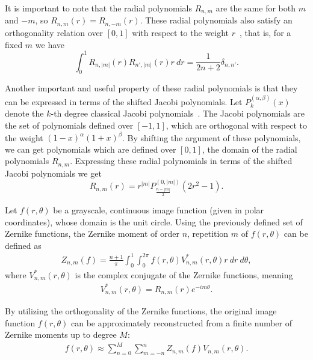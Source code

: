 It is important to note that the radial polynomials $R_{n,m}$ are the same for both $m$ and $-m$, so $R_{n,m}(r) = R_{n,-m}(r)$. These radial polynomials also satisfy an orthogonality relation over $[0,1]$ with respect to the weight $r$~\cite{schipp}, that is, for a fixed $m$ we have
\begin{equation}\label{Rortho}
	\int_0^1 R_{n,|m|}(r) R_{n',|m|}(r)r\ dr  = \frac{1}{2n+2} \delta_{n,n'}.
\end{equation}


Another important and useful property of these radial polynomials is that they can be expressed in terms of the shifted Jacobi polynomials. Let $P_k^{(\alpha, \beta)}(x)$ denote the $k$-th degree classical Jacobi polynomials~\cite{Szego}. The Jacobi polynomials are the set of polynomials defined over $[-1,1]$, which are orthogonal with respect to the weight $(1-x)^\alpha(1+x)^\beta$. By shifting the argument of these polynomials, we can get polynomials which are defined over $[0,1]$, the domain of the radial polynomials $R_{n,m}$. Expressing these radial polynomials in terms of the shifted Jacobi polynomials we get
\begin{equation}\label{RJacobi}
	R_{n,m}(r) = r^{|m|} P_{\frac{n - |m|}{2}}^{(0,|m|)}(2r^2-1).
\end{equation} 


Let $f(r,\theta)$ be a grayscale, continuous image function (given in polar coordinates), whose domain is the unit circle.
Using the previously defined set of Zernike functions, the Zernike moment of order $n$, repetition $m$ of $f(r,\theta)$ can be defined as
\begin{gather}\label{eq:complex_zernike_def}
    Z_{n,m}(f) = \frac{n + 1}{\pi}\int_0^1\int_0^{2\pi}f(r,\theta)V_{n,m}^{*}(r,\theta)r\ dr\ d\theta,
\end{gather}
where $V_{n,m}^{*}(r,\theta)$ is the complex conjugate of the Zernike functions, meaning
\begin{gather*}
    V_{n,m}^{*}(r,\theta) = R_{n,m}(r) e^{-i m\theta}.
\end{gather*}


By utilizing the orthogonality of the Zernike functions, the original image function $f(r,\theta)$ can be approximately reconstructed from a finite number of Zernike moments up to degree $M$:
\begin{gather}\label{eq:reconstruction}
    f(r,\theta) \approx \sum_{n=0}^{M}\sum_{m=-n}^{n}Z_{n,m}(f)V_{n,m}(r,\theta).
\end{gather}

